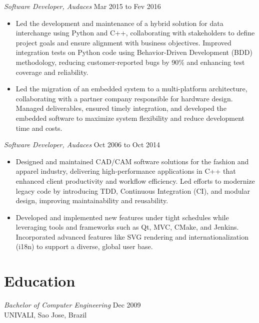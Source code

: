 \documentclass[line,margin]{res}
\begin{document}
\begin{resume}
\begin{itemize}
\end{itemize}

                {\sl Software Developer, Audaces} \hfill Mar 2015 to Fev 2016 \\
                  \begin{itemize}
                    \item Led the development and maintenance of a hybrid solution for data interchange using Python and C++, collaborating with stakeholders to define project goals and ensure alignment with business objectives. Improved integration tests on Python code using Behavior-Driven Development (BDD) methodology, reducing customer-reported bugs by 90\% and enhancing test coverage and reliability.
                    \item Led the migration of an embedded system to a multi-platform architecture, collaborating with a partner company responsible for hardware design. Managed deliverables, ensured timely integration, and developed the embedded software to maximize system flexibility and reduce development time and costs.
                   \end{itemize}

                {\sl Software Developer, Audaces} \hfill Oct 2006 to Oct 2014 \\
                  \begin{itemize}
                   \item Designed and maintained CAD/CAM software solutions for the fashion and apparel industry, delivering high-performance applications in C++ that enhanced client productivity and workflow efficiency. Led efforts to modernize legacy code by introducing TDD, Continuous Integration (CI), and modular design, improving maintainability and reusability.
\item Developed and implemented new features under tight schedules while leveraging tools and frameworks such as Qt, MVC, CMake, and Jenkins. Incorporated advanced features like SVG rendering and internationalization (i18n) to support a diverse, global user base.              
\end{itemize}
\section{Education} {\sl Bachelor of Computer Engineering} \hfill Dec 2009\\
                UNIVALI, Sao Jose, Brazil
\end{resume}
\end{document}

